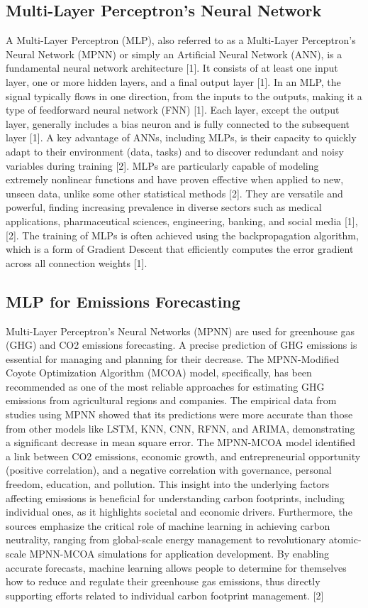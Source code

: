 \documentclass[12pt,a4paper]{article}
\begin{document}
\subsection{Multi-Layer Perceptron's Neural Network}

A Multi-Layer Perceptron (MLP), also referred to as a Multi-Layer Perceptron's Neural Network (MPNN) or simply an Artificial Neural Network (ANN), is a fundamental neural network architecture [1]. It consists of at least one input layer, one or more hidden layers, and a final output layer [1]. In an MLP, the signal typically flows in one direction, from the inputs to the outputs, making it a type of feedforward neural network (FNN) [1]. Each layer, except the output layer, generally includes a bias neuron and is fully connected to the subsequent layer [1]. A key advantage of ANNs, including MLPs, is their capacity to quickly adapt to their environment (data, tasks) and to discover redundant and noisy variables during training [2]. MLPs are particularly capable of modeling extremely nonlinear functions and have proven effective when applied to new, unseen data, unlike some other statistical methods [2]. They are versatile and powerful, finding increasing prevalence in diverse sectors such as medical applications, pharmaceutical sciences, engineering, banking, and social media [1], [2]. The training of MLPs is often achieved using the backpropagation algorithm, which is a form of Gradient Descent that efficiently computes the error gradient across all connection weights [1].

\subsection{MLP for Emissions Forecasting}

Multi-Layer Perceptron's Neural Networks (MPNN) are used for greenhouse gas (GHG) and CO2 emissions forecasting. A precise prediction of GHG emissions is essential for managing and planning for their decrease. The MPNN-Modified Coyote Optimization Algorithm (MCOA) model, specifically, has been recommended as one of the most reliable approaches for estimating GHG emissions from agricultural regions and companies. The empirical data from studies using MPNN showed that its predictions were more accurate than those from other models like LSTM, KNN, CNN, RFNN, and ARIMA, demonstrating a significant decrease in mean square error. The MPNN-MCOA model identified a link between CO2 emissions, economic growth, and entrepreneurial opportunity (positive correlation), and a negative correlation with governance, personal freedom, education, and pollution. This insight into the underlying factors affecting emissions is beneficial for understanding carbon footprints, including individual ones, as it highlights societal and economic drivers. Furthermore, the sources emphasize the critical role of machine learning in achieving carbon neutrality, ranging from global-scale energy management to revolutionary atomic-scale MPNN-MCOA simulations for application development. By enabling accurate forecasts, machine learning allows people to determine for themselves how to reduce and regulate their greenhouse gas emissions, thus directly supporting efforts related to individual carbon footprint management. [2]
\end{document}
